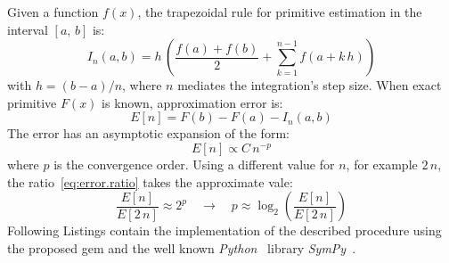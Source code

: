 Given a function $f(x)$, the trapezoidal rule for primitive estimation in the interval $[a,\,b]$ is:
\begin{equation}
  I_{n}(a, b) = h\, \left( \dfrac{f(a) + f(b)}{2} +
    \sum\limits_{k = 1}^{n - 1}{f \left( a + k \,h \right)} \right)
\end{equation}
with $h = (b - a) / n $, where $n$ mediates the integration's step size. When exact primitive $F(x)$ is known, approximation error is:
\begin{equation}
  E[n] = F(b) - F(a) - I_{n}(a, b)
\end{equation}
The error has an asymptotic expansion of the form:
\begin{equation}
  E[n] \propto C\,{n}^{-p}
\end{equation}
where $p$ is the convergence order. Using a different value for $n$, for example $2\,n$, the ratio~\ref{eq:error.ratio} takes the approximate vale:
\begin{equation}
  \label{eq:error.ratio}
  \dfrac{E[n]}{E[2\,n]} \approx 2^{p} \quad \rightarrow \quad p \approx \log_2 \left( \dfrac{E[n]}{E[2\,n]} \right)
\end{equation}
Following Listings contain the implementation of the described procedure using the proposed gem and the well known \emph{Python}~\cite{van2011python} library \emph{SymPy}~\cite{christopher_smith_2016_47274}.

\noindent%
\begin{minipage}{.5\textwidth}

\end{minipage}\hfill
\begin{minipage}{.5\textwidth}

\end{minipage}

